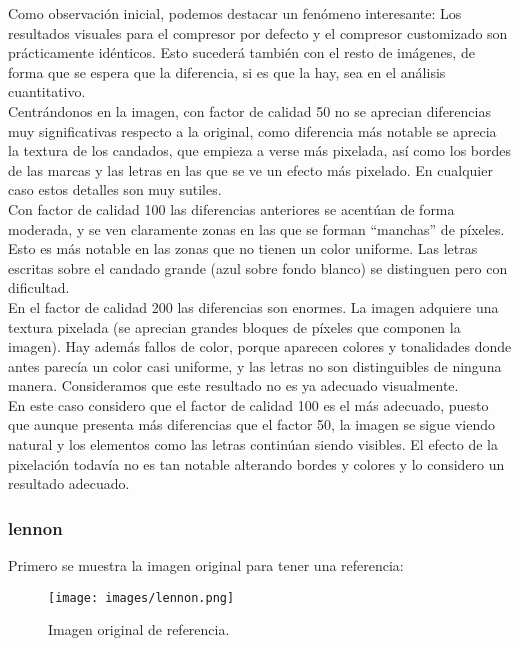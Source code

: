 \documentclass[12pt,a4paper]{article}
\begin{document}
Como observación inicial, podemos destacar un fenómeno interesante: Los resultados visuales para el compresor por defecto y el compresor customizado son prácticamente idénticos. Esto sucederá también con el resto de imágenes, de forma que se espera que la diferencia, si es que la hay, sea en el análisis cuantitativo.\\

Centrándonos en la imagen, con factor de calidad 50 no se aprecian diferencias muy significativas respecto a la original, como diferencia más notable se aprecia la textura de los candados, que empieza a verse más pixelada, así como los bordes de las marcas y las letras en las que se ve un efecto más pixelado. En cualquier caso estos detalles son muy sutiles.\\

Con factor de calidad 100 las diferencias anteriores se acentúan de forma moderada, y se ven claramente zonas en las que se forman ``manchas'' de píxeles. Esto es más notable en las zonas que no tienen un color uniforme. Las letras escritas sobre el candado grande (azul sobre fondo blanco) se distinguen pero con dificultad.\\

En el factor de calidad 200 las diferencias son enormes. La imagen adquiere una textura pixelada (se aprecian grandes bloques de píxeles que componen la imagen). Hay además fallos de color, porque aparecen colores y tonalidades donde antes parecía un color casi uniforme, y las letras no son distinguibles de ninguna manera. Consideramos que este resultado no es ya adecuado visualmente.\\

En este caso considero que el factor de calidad 100 es el más adecuado, puesto que aunque presenta más diferencias que el factor 50, la imagen se sigue viendo natural y los elementos como las letras continúan siendo visibles. El efecto de la pixelación todavía no es tan notable alterando bordes y colores y lo considero un resultado adecuado.\\



\subsubsection{lennon}
Primero se muestra la imagen original para tener una referencia:
\begin{figure}[H]
    \centering
    \texttt{[image: images/lennon.png]}
    \caption[Referencia - lennon]{Imagen original de referencia.}
    
 \end{figure}   
    \vspace{0.5cm}
    
\end{document}
